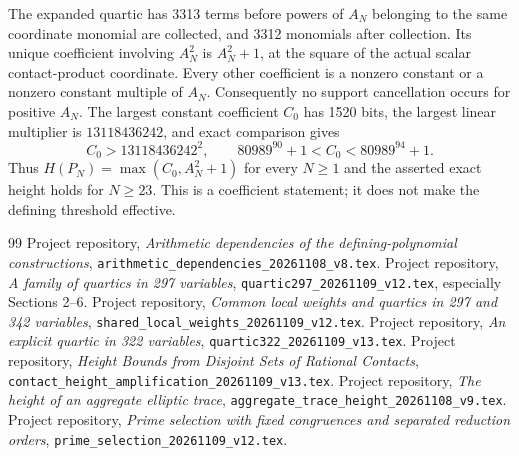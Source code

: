 \documentclass[11pt,a4paper]{article}
\begin{document}
The expanded quartic has 3313 terms before powers of $A_N$ belonging
to the same coordinate monomial are collected, and 3312 monomials
after collection. Its unique coefficient involving $A_N^2$ is
$A_N^2+1$, at the square of the actual scalar contact-product coordinate.
Every other coefficient is a nonzero constant or a nonzero constant
multiple of $A_N$. Consequently no support cancellation occurs for
positive $A_N$. The largest constant coefficient $C_0$ has 1520 bits,
the largest linear multiplier is $13118436242$, and exact comparison
gives
\[
 C_0>13118436242^2,\qquad
 80989^{90}+1<C_0<80989^{94}+1.
\]
Thus $H(P_N)=\max(C_0,A_N^2+1)$ for every $N\ge1$ and the asserted
exact height holds for $N\ge23$. This is a coefficient statement;
it does not make the defining threshold effective.

\begin{thebibliography}{99}\small\setlength{\itemsep}{2pt}
 Project repository,
\emph{Arithmetic dependencies of the defining-polynomial constructions},
\nolinkurl{arithmetic_dependencies_20261108_v8.tex}.
 Project repository,
\emph{A family of quartics in 297 variables},
\nolinkurl{quartic297_20261109_v12.tex}, especially Sections 2--6.
 Project repository,
\emph{Common local weights and quartics in 297 and 342 variables},
\nolinkurl{shared_local_weights_20261109_v12.tex}.
 Project repository,
\emph{An explicit quartic in 322 variables},
\nolinkurl{quartic322_20261109_v13.tex}.
 Project repository,
\emph{Height Bounds from Disjoint Sets of Rational Contacts},
\nolinkurl{contact_height_amplification_20261109_v13.tex}.
 Project repository,
\emph{The height of an aggregate elliptic trace},
\nolinkurl{aggregate_trace_height_20261108_v9.tex}.
 Project repository,
\emph{Prime selection with fixed congruences and separated reduction orders},
\nolinkurl{prime_selection_20261109_v12.tex}.
\end{thebibliography}
\end{document}
